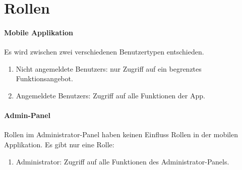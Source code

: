 \section{Rollen}

\paragraph{Mobile Applikation}
Es wird zwischen zwei verschiedenen \Gls{Benutzer}typen entschieden.
\begin{enumerate}
    \item Nicht angemeldete \Glspl{Benutzer}: nur Zugriff auf ein begrenztes Funktionsangebot.
    \item Angemeldete \Glspl{Benutzer}: Zugriff auf alle Funktionen der App.
\end{enumerate}

\paragraph{Admin-Panel}
Rollen im \Gls{Administrator}-Panel haben keinen Einfluss Rollen in der mobilen Applikation.
Es gibt nur eine Rolle:
\begin{enumerate}
    \item \Gls{Administrator}: Zugriff auf alle Funktionen des \Gls{Administrator}-Panels.
\end{enumerate}
